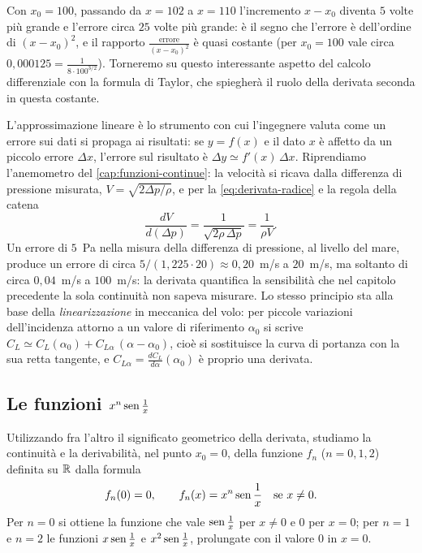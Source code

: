 Con $x_{0}=100$, passando da $x=102$ a $x=110$ l'incremento $x-x_{0}$ diventa $5$ volte
più grande e l'errore circa $25$ volte più grande: è il segno che l'errore è dell'ordine
di $(x-x_{0})^{2}$, e il rapporto $\frac{\text{errore}}{(x-x_{0})^{2}}$ è quasi costante
(per $x_{0}=100$ vale circa $0{,}000125=\frac1{8\cdot100^{3/2}}$). Torneremo su questo
interessante aspetto del calcolo differenziale con la formula di Taylor, che spiegherà
il ruolo della derivata seconda in questa costante.

\begin{idea}
L'approssimazione lineare è lo strumento con cui l'ingegnere valuta come un errore sui
dati si propaga ai risultati: se $y=f(x)$ e il dato $x$ è affetto da un piccolo errore
$\Delta x$, l'errore sul risultato è $\Delta y\simeq f'(x)\,\Delta x$. Riprendiamo
l'anemometro del \cref{cap:funzioni-continue}: la velocità si ricava dalla differenza di
pressione misurata, $V=\sqrt{2\Delta p/\rho}$, e per la \eqref{eq:derivata-radice} e la
regola della catena
\[
  \frac{dV}{d(\Delta p)}=\frac1{\sqrt{2\rho\,\Delta p}}=\frac1{\rho V}.
\]
Un errore di $5$~Pa nella misura della differenza di pressione, al livello del mare,
produce un errore di circa $5/(1{,}225\cdot20)\approx0{,}20$~m/s a $20$~m/s, ma soltanto
di circa $0{,}04$~m/s a $100$~m/s: la derivata quantifica la sensibilità che nel capitolo
precedente la sola continuità non sapeva misurare. Lo stesso principio sta alla base
della \emph{linearizzazione} in meccanica del volo: per piccole variazioni
dell'incidenza attorno a un valore di riferimento $\alpha_{0}$ si scrive
$C_{L}\simeq C_{L}(\alpha_{0})+C_{L\alpha}\,(\alpha-\alpha_{0})$, cioè si sostituisce la curva
di portanza con la sua retta tangente, e $C_{L\alpha}=\frac{dC_{L}}{d\alpha}(\alpha_{0})$ è
proprio una derivata.
\end{idea}

\subsection{Le funzioni $x^{n}\operatorname{sen}\frac1x$}

Utilizzando fra l'altro il significato geometrico della derivata, studiamo la continuità
e la derivabilità, nel punto $x_{0}=0$, della funzione $f_{n}$ ($n=0,1,2$) definita su $\mathbb{R}$
dalla formula
\begin{equation}\label{eq:fn}
  f_{n}(0)=0, \qquad f_{n}(x)=x^{n}\operatorname{sen}\frac1x \quad\text{se } x\neq0 .
\end{equation}
Per $n=0$ si ottiene la funzione che vale $\operatorname{sen}\frac1x$ per $x\neq0$ e $0$ per $x=0$; per
$n=1$ e $n=2$ le funzioni $x\operatorname{sen}\frac1x$ e $x^{2}\operatorname{sen}\frac1x$, prolungate con il valore
$0$ in $x=0$.

